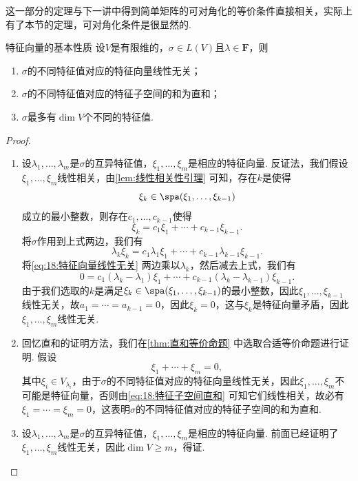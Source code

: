 这一部分的定理与下一讲中得到简单矩阵的可对角化的等价条件直接相关，实际上有了本节的定理，可对角化条件是很显然的.
\begin{theorem}{}{特征向量的基本性质}
    设$V$是有限维的，$\sigma\in L(V)$且$\lambda\in\mathbf{F}$，则
    \begin{enumerate}
        \item $\sigma$的不同特征值对应的特征向量线性无关；

        \item $\sigma$的不同特征值对应的特征子空间的和为直和；

        \item $\sigma$最多有$\dim V$个不同的特征值.
    \end{enumerate}
\end{theorem}

\begin{proof}
    \begin{enumerate}
        \item 设$\lambda_1,\ldots,\lambda_m$是$\sigma$的互异特征值，$\xi_1,\ldots,\xi_m$是相应的特征向量. 反证法，我们假设$\xi_1,\ldots,\xi_m$线性相关，由\autoref{lem:线性相关性引理} 可知，存在$k$是使得
              \[\xi_k\in\spa(\xi_1,\ldots,\xi_{k-1})\]
              成立的最小整数，则存在$c_1,\ldots,c_{k-1}$使得
              \begin{equation}\label{eq:18:特征向量线性无关}
                  \xi_k=c_1\xi_1+\cdots+c_{k-1}\xi_{k-1}.
              \end{equation}
              将$\sigma$作用到上式两边，我们有
              \[\lambda_k\xi_k=c_1\lambda_1\xi_1+\cdots+c_{k-1}\lambda_{k-1}\xi_{k-1}.\]
              将\autoref{eq:18:特征向量线性无关} 两边乘以$\lambda_k$，然后减去上式，我们有
              \[0=c_1(\lambda_k-\lambda_1)\xi_1+\cdots+c_{k-1}(\lambda_k-\lambda_{k-1})\xi_{k-1}.\]
              由于我们选取的$k$是满足$\xi_k\in\spa(\xi_1,\ldots,\xi_{k-1})$的最小整数，因此$\xi_1,\ldots,\xi_{k-1}$线性无关，故$a_1=\cdots=a_{k-1}=0$，因此$\xi_k=0$，这与$\xi_k$是特征向量矛盾，因此$\xi_1,\ldots,\xi_m$线性无关.

        \item 回忆直和的证明方法，我们在\autoref{thm:直和等价命题} 中选取合适等价命题进行证明. 假设
              \begin{equation}\label{eq:18:特征子空间直和}
                  \xi_1+\cdots+\xi_m=0,
              \end{equation}
              其中$\xi_i\in V_{\lambda_i}$，由于$\sigma$的不同特征值对应的特征向量线性无关，因此$\xi_1,\ldots,\xi_m$不可能是特征向量，否则由\autoref{eq:18:特征子空间直和} 可知它们线性相关，故必有$\xi_1=\cdots=\xi_m=0$，这表明$\sigma$的不同特征值对应的特征子空间的和为直和.

        \item 设$\lambda_1,\ldots,\lambda_m$是$\sigma$的互异特征值，$\xi_1,\ldots,\xi_m$是相应的特征向量. 前面已经证明了$\xi_1,\ldots,\xi_m$线性无关，因此$\dim V\geqslant m$，得证.
    \end{enumerate}
\end{proof}

